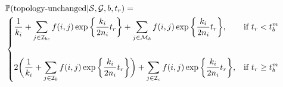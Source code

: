 \documentclass[11pt]{article}
\begin{document}



\begin{equation}
\begin{aligned}
	&\mathbb{P}(\textrm{topology-unchanged} | \mathcal{S},\mathcal{G},b,t_r)=
	\\
	&\begin{dcases}
		\frac{1}{k_i} + 
		\sum_{j \in \mathcal{I}_{bc}} f(i,j) \exp \bigg\{ \frac{k_i}{2n_i}t_r \bigg\} + 
		\sum_{j \in \mathcal{M}_b} f(i,j) \exp \bigg\{ \frac{k_i}{2n_i}t_r \bigg\}, 
		& \text{if } t_r < t_b^m \\
		\\
		2\bigg(
			\frac{1}{k_i} + 
			\sum_{j \in \mathcal{I}_b} f(i,j) \exp \bigg\{ \frac{k_i}{2n_i}t_r \bigg\}
		\bigg) + 
		\sum_{j \in \mathcal{I}_c} f(i,j) \exp\bigg\{ \frac{k_i}{2n_i}t_r \bigg\},
		& \text{if } t_r \ge t_b^m \\
	\end{dcases}
\end{aligned}
\end{equation}
\end{document}
